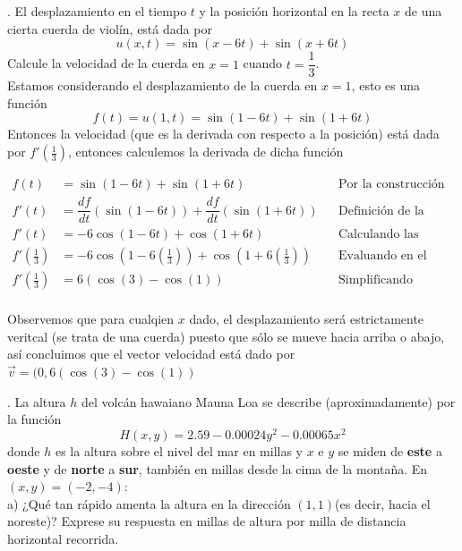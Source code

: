 \documentclass[letterpaper]{article}
\renewcommand{\*}{\cdot}
\theoremstyle{definition}
\begin{document}
. El desplazamiento en el tiempo $ t $ y la posición horizontal en la recta $ x $ de una cierta cuerda de violín, está dada por $$ u(x,t) = \sin(x - 6t) + \sin(x+6t) $$ Calcule la velocidad de la cuerda en $ x = 1 $ cuando $ t = \dfrac{1}{3} $.\\
Estamos considerando el desplazamiento de la cuerda en $ x = 1 $, esto es una función 
\[ f(t) = u(1,t) = \sin(1-6t) + \sin(1 + 6t) \]
Entonces la velocidad (que es la derivada con respecto a la posición) está dada por $ f'(\frac{1}{3}) $, entonces calculemos la derivada de dicha función

\begin{align*}
	f(t) &= \sin(1-6t) + \sin(1 + 6t) && \text{Por la construcción de dicha función respecto al tiempo}\\
	f'(t) &= \dfrac{df}{dt}(\sin(1-6t)) + \dfrac{df}{dt}(\sin(1 + 6t)) && \text{Definición de la derivada}\\
	f'(t) &= -6\cos(1-6t) + \cos(1 + 6t) && \text{Calculando las derivadas}\\
	f'\left(\frac{1}{3}\right) &= -6\cos(1-6\left(\frac{1}{3}\right)) + \cos(1 + 6\left(\frac{1}{3}\right)) && \text{Evaluando en el tiempo dado}\\
	f'\left(\frac{1}{3}\right) &= 6(\cos(3)- \cos(1)) && \text{Simplificando (factorizando y usando la paridad del coseno)}\\
\end{align*}
\begin{center}
	Observemos que para cualqien $ x $ dado, el desplazamiento será estrictamente veritcal (se trata de una cuerda) puesto que sólo se mueve hacia arriba o abajo, así concluimos que el vector velocidad está dado por $ \vec{v} = (0,6(\cos(3) - \cos(1)) $
\end{center}

. La altura $ h $ del volcán hawaiano Mauna Loa se describe (aproximadamente) por la función $$ H(x,y) = 2.59 - 0.00024y^2 - 0.00065x^2 $$donde $ h $ es la altura sobre el nivel del mar en millas y $ x $ e $ y $ se miden de \textbf{este} a \textbf{oeste} y de \textbf{norte} a \textbf{sur}, también en millas desde la cima de la montaña. En $ (x,y) = (-2,-4) $:\\

a) ¿Qué tan rápido amenta la altura en la dirección $ (1,1) $(es decir, hacia el noreste)? Exprese su respuesta en millas de altura por milla de distancia horizontal recorrida.\\
\end{document}
